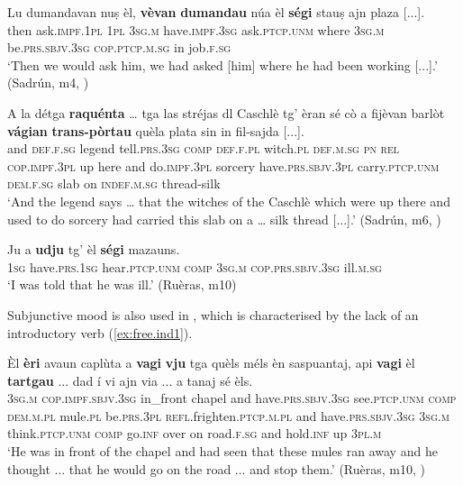 \ea
\label{ex:subj2}
\gll Lu dumandavan nuṣ èl, \textbf{vèvan} \textbf{dumandau} núa èl \textbf{ségi} stauṣ ajn plaza [...].\\
then ask.\textsc{impf.1pl} \textsc{1pl} \textsc{3sg.m} have.\textsc{impf.3sg}  ask.\textsc{ptcp.unm} where \textsc{3sg.m} be.\textsc{prs.sbjv.3sg} \textsc{cop.ptcp.m.sg} in job.\textsc{f.sg}\\
\glt `Then we would ask him, we had asked [him] where he had been working [...].' (Sadrún, m4, )
\z

\ea
\label{ex:subj3}
\gll    A la détga \textbf{raquénta} … tga las stréjas dl Caschlè tg’ èran sé cò a fijèvan barlòt \textbf{vágian} \textbf{trans-pòrtau} quèla plata sin\footnotemark{} in fil-sajda [...].\\
and \textsc{def.f.sg} legend tell.\textsc{prs.3sg} {} \textsc{comp} \textsc{def.f.pl} witch.\textsc{pl} \textsc{def.m.sg} \textsc{pn} \textsc{rel} \textsc{cop.impf.3pl} up here and do.\textsc{impf.3pl} sorcery have.\textsc{prs.sbjv.3pl} carry.\textsc{ptcp.unm} \textsc{dem.f.sg} slab on \textsc{indef.m.sg} thread-silk\\
\glt `And the legend says … that the witches of the Caschlè which were up there and used to do sorcery had carried this slab on a … silk thread [...].' (Sadrún, m6, )
\z

\ea
\label{ex:subj4}
\gll Ju a \textbf{udju} tg' èl \textbf{ségi} mazauns.\\
\textsc{1sg} have.\textsc{prs.1sg} hear.\textsc{ptcp.unm} \textsc{comp} \textsc{3sg.m} \textsc{cop.prs.sbjv.3sg} ill.\textsc{m.sg}\\
\glt `I was told that he was ill.' (Ruèras, m10)
\z

Subjunctive mood is also used in , which is characterised by the lack of an introductory verb (\ref{ex:free.ind1}).

\ea
\label{ex:free.ind1}
\gll  Èl \textbf{èri} avaun caplùta a \textbf{vagi} \textbf{vju} tga quèls méls èn saspuantaj, api \textbf{vagi} èl \textbf{tartgau} ... dad í vi ajn via ... a tanaj sé èls.  \\
\textsc{3sg.m} \textsc{cop.impf.sbjv.3sg} in\_front chapel and have.\textsc{prs.sbjv.3sg} see.\textsc{ptcp.unm} \textsc{comp} \textsc{dem.m.pl} mule.\textsc{pl} be.\textsc{prs.3pl} \textsc{refl.}frighten.\textsc{ptcp.m.pl} and have.\textsc{prs.sbjv.3sg} \textsc{3sg.m} think.\textsc{ptcp.unm} {} \textsc{comp} go.\textsc{inf} over on road.\textsc{f.sg} {} and hold.\textsc{inf} up \textsc{3pl.m}\\
\glt `He was in front of the chapel and had seen that these mules ran away and he thought ... that he would go on the road ... and stop them.' (Ruèras, m10, )
\z

